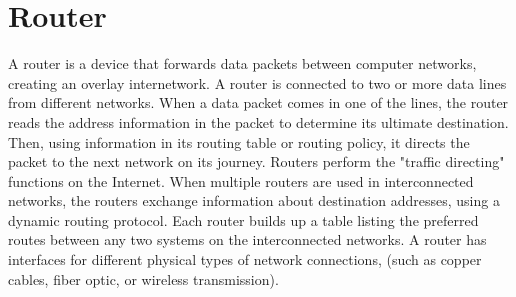 \section{Router}
A router is a device that forwards data packets between computer networks, creating an overlay internetwork. A router is connected to two or more data lines from different networks. When a data packet comes in one of the lines, the router reads the address information in the packet to determine its ultimate destination. Then, using information in its routing table or routing policy, it directs the packet to the next network on its journey. Routers perform the "traffic directing" functions on the Internet. 
When multiple routers are used in interconnected networks, the routers exchange information about destination addresses, using a dynamic routing protocol. Each router builds up a table listing the preferred routes between any two systems on the interconnected networks. A router has interfaces for different physical types of network connections, (such as copper cables, fiber optic, or wireless transmission).